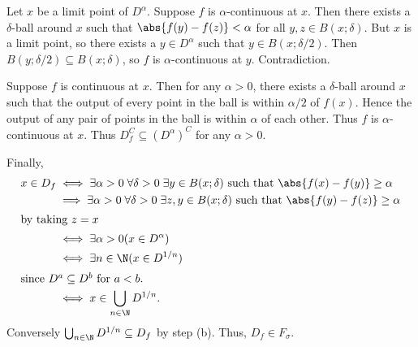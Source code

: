 \documentclass[12pt]{article}
\begin{document}
\begin{solution}
    Let $x$ be a limit point of $D^\alpha$.
    Suppose $f$ is $\alpha$-continuous at $x$.
    Then there exists a $\delta$-ball around $x$ such that
    $\abs{f(y) - f(z)} < \alpha$ for all $y, z \in B(x; \delta)$.
    But $x$ is a limit point, so there exists a $y \in D^\alpha$ such that
    $y \in B(x; \delta/2)$.
    Then $B(y; \delta/2) \subseteq B(x; \delta)$,
    so $f$ is $\alpha$-continuous at $y$.
    Contradiction.

    Suppose $f$ is continuous at $x$.
    Then for any $\alpha > 0$, there exists a $\delta$-ball around $x$
    such that the output of every point in the ball is within $\alpha/2$
    of $f(x)$.
    Hence the output of any pair of points in the ball is within $\alpha$
    of each other.
    Thus $f$ is $\alpha$-continuous at $x$.
    Thus $D_f^C \subseteq (D^\alpha)^C$ for any $\alpha > 0$.

    Finally, \begin{align*}
        x \in D_f &\iff
        \exists \alpha > 0 \; \forall \delta > 0 \;\exists y \in B(x; \delta)
        \text{ such that } \abs{f(x) - f(y)} \ge \alpha \\
        &\implies \exists \alpha > 0 \; \forall \delta > 0 \; \exists z, y
        \in B(x; \delta) \text{ such that } \abs{f(y) - f(z)} \ge \alpha \\
    \intertext{by taking $z = x$}
        &\iff \exists \alpha > 0 (x \in D^\alpha) \\
        &\iff \exists n \in \N (x \in D^{1/n}) \\
    \intertext{since $D^a \subseteq D^b$ for $a < b$.}
        &\iff x \in \bigcup_{n \in \N} D^{1/n}.
    \end{align*}
    Conversely $\bigcup_{n \in \N} D^{1/n} \subseteq D_f$ by step (b).
    Thus, $D_f \in F_\sigma$.
\end{solution}
\end{document}
